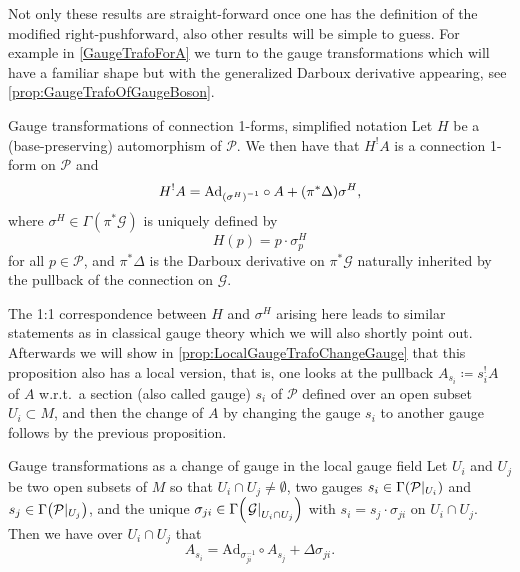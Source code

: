 \documentclass[reqno,a4paper,oneside]{amsart}
\theoremstyle{plain}
\theoremstyle{remark}
\theoremstyle{definition}
\begin{document}
Not only these results are straight-forward once one has the definition of the modified right-pushforward, also other results will be simple to guess. For example in \ref{GaugeTrafoForA} we turn to the gauge transformations which will have a familiar shape but with the generalized Darboux derivative appearing, see \ref{prop:GaugeTrafoOfGaugeBoson}.

\begin{propositions*}{Gauge transformations of connection 1-forms, simplified notation}
Let $H$ be a (base-preserving) automorphism of $\mathcal{P}$. We then have that $H^!A$ is a connection 1-form on $\mathcal{P}$ and
\begin{equation*}
H^!A
=
{\mathrm{Ad}_{\mleft(\sigma^H\mright)^{-1}}} \circ A 
	+ \mleft(\pi^*\Delta\mright)\sigma^H,
\end{equation*}
where $\sigma^H \in \Gamma(\pi^*\mathcal{G})$ is uniquely defined by
\begin{equation*}
H(p)
=
p \cdot \sigma_p^H
\end{equation*}
for all $p \in \mathcal{P}$, and $\pi^*\Delta$ is the Darboux derivative on $\pi^*\mathcal{G}$ naturally inherited by the pullback of the connection on $\mathcal{G}$.
\end{propositions*}

The 1:1 correspondence between $H$ and $\sigma^H$ arising here leads to similar statements as in classical gauge theory which we will also shortly point out. Afterwards we will show in \ref{prop:LocalGaugeTrafoChangeGauge} that this proposition also has a local version, that is, one looks at the pullback $A_{s_i} \coloneqq s_i^!A$ of $A$ w.r.t.\ a section (also called gauge) $s_i$ of $\mathcal{P}$ defined over an open subset $U_i \subset M$, and then the change of $A$ by changing the gauge $s_i$ to another gauge follows by the previous proposition.

\begin{propositions*}{Gauge transformations as a change of gauge in the local gauge field}
Let $U_i$ and $U_j$ be two open subsets of $M$ so that $U_i \cap U_j \neq \emptyset$, two gauges $s_i \in \Gamma\mleft(\mathcal{P}|_{U_i}\mright)$ and $s_j \in \Gamma\mleft(\mathcal{P}|_{U_j}\mright)$, and the unique $\sigma_{ji} \in \Gamma\mleft( \mleft.\mathcal{G}\mright|_{U_i \cap U_j} \mright)$ with $s_i = s_j \cdot \sigma_{ji}$ on $U_i \cap U_j$. Then we have over $U_i \cap U_j$ that
\begin{equation*}
A_{s_i}
=
\mathrm{Ad}_{\sigma_{ji}^{-1}}\circ A_{s_j}
	+ \Delta\sigma_{ji}.
\end{equation*}
\end{propositions*}
\end{document}
